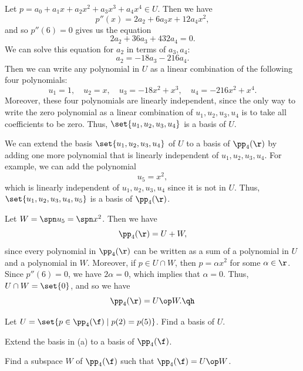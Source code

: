 \begin{sole}
    \item Let $p = a_0 + a_1 x + a_2 x^2 + a_3 x^3 + a_4 x^4 \in U$. Then we have
    \[p''(x) = 2a_2 + 6a_3 x + 12a_4 x^2,\]
    and so $p''(6) = 0$ gives us the equation
    \[2a_2 + 36a_3 + 432a_4 = 0.\]
    We can solve this equation for $a_2$ in terms of $a_3, a_4$:
    \[a_2 = -18a_3 - 216a_4.\]
    Then we can write any polynomial in $U$ as a linear combination of the following four polynomials:
    \[u_1 = 1, \quad u_2 = x, \quad u_3 = -18x^2 + x^3, \quad u_4 = -216x^2 + x^4.\]
    Moreover, these four polynomials are linearly independent, since the only way to write the zero polynomial as a linear combination of $u_1, u_2, u_3, u_4$ is to take all coefficients to be zero. Thus, $\set{u_1, u_2, u_3, u_4}$ is a basis of $U$.
    \item We can extend the basis $\set{u_1, u_2, u_3, u_4}$ of $U$ to a basis of $\pp_4(\r)$ by adding one more polynomial that is linearly independent of $u_1, u_2, u_3, u_4$. For example, we can add the polynomial
    \[u_5 = x^2,\]
    which is linearly independent of $u_1, u_2, u_3, u_4$ since it is not in $U$. Thus, $\set{u_1, u_2, u_3, u_4, u_5}$ is a basis of $\pp_4(\r)$.
    \item Let $W = \spn u_5 = \spn x^2$. Then we have
    \[\pp_4(\r) = U + W,\]
    since every polynomial in $\pp_4(\r)$ can be written as a sum of a polynomial in $U$ and a polynomial in $W$. Moreover, if $p \in U \cap W$, then $p = \alpha x^2$ for some $\alpha \in \r$. Since $p''(6) = 0$, we have $2\alpha = 0$, which implies that $\alpha = 0$. Thus, $U \cap W = \set{0}$, and so we have
    \[\pp_4(\r) = U \op W. \qh\]
\end{sole}

\begin{exercise}[2c5]
    \begin{subexercises}
        \item Let $U = \set{p \in \pp_4(\f) \mid p(2) = p(5)}$. Find a basis of $U$.
        \item Extend the basis in (a) to a basis of $\pp_4(\f)$.
        \item Find a subspace $W$ of $\pp_4(\f)$ such that $\pp_4(\f) = U \op W$.
    \end{subexercises}
\end{exercise}

